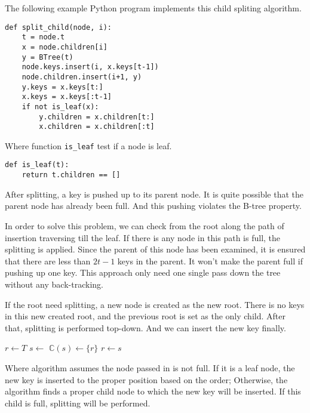 \documentclass{article}
\begin{document}
The following example Python program implements this child spliting algorithm.

\lstset{language=Python}
\begin{lstlisting}
def split_child(node, i):
    t = node.t
    x = node.children[i]
    y = BTree(t)
    node.keys.insert(i, x.keys[t-1])
    node.children.insert(i+1, y)
    y.keys = x.keys[t:]
    x.keys = x.keys[:t-1]
    if not is_leaf(x):
        y.children = x.children[t:]
        x.children = x.children[:t]
\end{lstlisting}

Where function \texttt{is\_leaf} test if a node is leaf.

\lstset{language=Python}
\begin{lstlisting}
def is_leaf(t):
    return t.children == []
\end{lstlisting}


After splitting, a key is pushed up to its parent node.
It is quite possible that the parent node has already been full.
And this pushing violates the B-tree property.

In order to solve this problem, we can check from the root along
the path of insertion traversing till the leaf. If there is any node
in this path is full, the splitting is applied. Since the parent
of this node has been examined, it is ensured that there are
less than $2t-1$ keys in the parent. It won't make the
parent full if pushing up one key. This approach only need one single
pass down the tree without any back-tracking.

If the root need splitting, a new node is created as the new root.
There is no keys in this new created root, and the previous root is
set as the only child. After that, splitting is performed top-down.
And we can insert the new key finally.

\begin{algorithmic}[1]
  \State $r \gets T$
   
    \State $s \gets$ 
    \State $\mathbb{C}(s) \gets \{r\}$
    \State {}
    \State $r \gets s$
  \EndIf
  \State \Return {}
\EndFunction
\end{algorithmic}

Where algorithm  assumes the node passed in
is not full. If it is a leaf node, the new key is inserted to
the proper position based on the order; Otherwise, the algorithm
finds a proper child node to which the new key will be inserted.
If this child is full, splitting will be performed.
\end{document}
